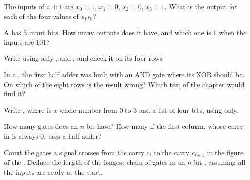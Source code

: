 \begin{exercise}[$\star$]\label{exo:g11:gates-to-arithmetic-unit:3}
The inputs of a $4{:}1$  are $x_0 = 1$, $x_1 = 0$, $x_2 = 0$, $x_3 = 1$. What is the output for each of
the four values of $s_1 s_0$?
\end{exercise}

\begin{exercise}[$\star$]\label{exo:g11:gates-to-arithmetic-unit:4}
A  has $3$ input bits. How many outputs does it have, and which one is $1$ when the inputs are $101$?
\end{exercise}

\begin{exercise}[$\star$]\label{exo:g11:gates-to-arithmetic-unit:5}
Write  using only ,  and , and check it on its four rows.
\end{exercise}

\begin{exercise}[$\star\star$]\label{exo:g11:gates-to-arithmetic-unit:6}
In a , the first half adder was built with an AND gate where its XOR should be. On which of the eight rows
is the result wrong? Which test of the chapter would find it?
\end{exercise}

\begin{exercise}[$\star\star$]\label{exo:g11:gates-to-arithmetic-unit:7}
Write , where  is a whole number from $0$ to $3$ and  a list of four
bits, using  only.
\end{exercise}

\begin{exercise}[$\star\star$]\label{exo:g11:gates-to-arithmetic-unit:8}
How many gates does an $n$-bit  have? How many if the first column, whose carry in is always $0$,
uses a half adder?
\end{exercise}

\begin{exercise}[$\star\star$]\label{exo:g11:gates-to-arithmetic-unit:9}
Count the gates a signal crosses from the carry $c_i$ to the carry $c_{i+1}$ in the figure of the . Deduce
the length of the longest chain of gates in an $n$-bit , assuming all the inputs are ready at the
start.
\end{exercise}

